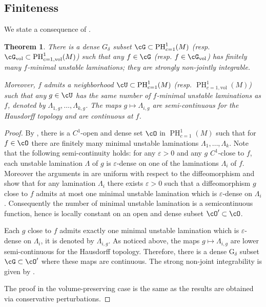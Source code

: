 \documentclass[a4paper,11pt]{amsart}
\numberwithin{equation}{section}     %
\newtheorem{teo}{Theorem}[section]
\theoremstyle{definition}
\theoremstyle{remark}
\DeclareMathOperator{\PH}{PH}
\begin{document}
\subsection{Finiteness}\label{ss.finiteness}

We state a consequence of \cite{CPoS}.

\begin{teo}\label{T.RobustSH}
There is a dense $G_\delta$ subset $\cG \subset \PH^1_{c=1}(M)$  (resp. $\cG_{\mathrm{vol}} \subset \PH^1_{c=1, \mathrm{vol}}(M)$) such that any $f \in \cG$ (resp. $f \in \cG_{\mathrm{vol}}$) has finitely many $f$-minimal unstable laminations; they are strongly non-jointly integrable.

Moreover, $f$ admits a neighborhood $\cU\subset\PH^1_{c=1}(M)$  (resp. $\PH^1_{c=1, \mathrm{vol}}(M)$)
such that any $g\in \cU$ has the same number of $f$-minimal unstable laminations as $f$,
denoted by $\Lambda_{1,g},\dots,\Lambda_{k,g}$. The maps $g\mapsto \Lambda_{i,g}$ are semi-continuous for the Hausdorff topology and are continuous at $f$.
\end{teo} 

\begin{proof}
By \cite[Theorem C] {CPoS}, there is a $C^1$-open and dense set $\cO$ in $\PH^{1}_{c=1}(M)$ such that for $f \in \cO$ there are finitely many minimal unstable laminations $\Lambda_1, \ldots, \Lambda_k$.
Note that the following semi-continuity holds: for any $\varepsilon>0$ and any $g$ $C^1$-close to $f$,
each unstable lamination $\Lambda$ of $g$ is $\varepsilon$-dense on one of the laminations
$\Lambda_i$ of $f$. Moreover the arguments in \cite[\S 2.5]{CPoS} are uniform with respect to the diffeomorphism
and show that for any lamination $\Lambda_i$ there exists $\varepsilon>0$ such that a diffeomorphism $g$ close to $f$ admits at most one minimal unstable lamination which is $\varepsilon$-dense on $\Lambda_i$.
Consequently the number of minimal unstable lamination is a semicontinuous function, hence is locally constant on an open and dense subset $\cO' \subset \cO$.

Each $g$ close to $f$ admits exactly one minimal unstable lamination
which is $\varepsilon$-dense on $\Lambda_i$, it is denoted by $\Lambda_{i,g}$.
As noticed above, the maps $g\mapsto \Lambda_{i,g}$ are lower semi-continuous for the Hausdorff topology.
Therefore, there is a dense G$_\delta$ subset $\cG\subset\cO'$ where these maps are continuous.
The strong non-joint integrability is given by \cite[Theorem 2.1]{CPoS}.

The proof in the volume-preserving case is the same as the results \cite{CPoS} are obtained via conservative perturbations.
\end{proof}
\end{document}
